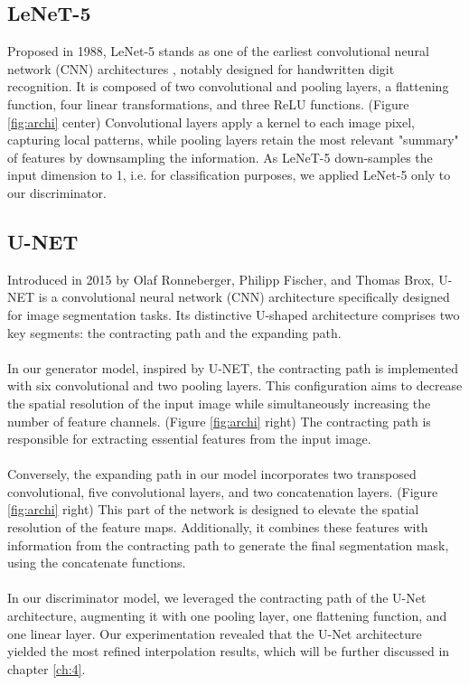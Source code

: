 \subsection{LeNeT-5}\label{sub:lenet}
Proposed in 1988, LeNet-5 stands as one of the earliest convolutional neural network (CNN) architectures \cite{lecun1998gradient}, notably designed for handwritten digit recognition. It is composed of two convolutional and pooling layers, a flattening function, four linear transformations, and three ReLU functions. (Figure \ref{fig:archi} center) 
Convolutional layers apply a kernel to each image pixel, capturing local patterns, while pooling layers retain the most relevant "summary" of features by downsampling the information. As LeNeT-5 down-samples the input dimension to 1, i.e. for classification purposes, we applied LeNet-5 only to our discriminator.

\subsection{U-NET}\label{sub:unet}
Introduced in 2015 by Olaf Ronneberger, Philipp Fischer, and Thomas Brox, U-NET is a convolutional neural network (CNN) architecture specifically designed for image segmentation tasks. Its distinctive U-shaped architecture comprises two key segments: the contracting path and the expanding path. \cite{ronneberger2015u, long2015fully}
\\\\
In our generator model, inspired by U-NET, the contracting path is implemented with six convolutional and two pooling layers. This configuration aims to decrease the spatial resolution of the input image while simultaneously increasing the number of feature channels. (Figure \ref{fig:archi} right) The contracting path is responsible for extracting essential features from the input image.
\\\\
Conversely, the expanding path in our model incorporates two transposed convolutional, five convolutional layers, and two concatenation layers.  (Figure \ref{fig:archi} right) This part of the network is designed to elevate the spatial resolution of the feature maps. Additionally, it combines these features with information from the contracting path to generate the final segmentation mask, using the concatenate functions.
\\\\
In our discriminator model, we leveraged the contracting path of the U-Net architecture, augmenting it with one pooling layer, one flattening function, and one linear layer. Our experimentation revealed that the U-Net architecture yielded the most refined interpolation results, which will be further discussed in chapter \ref{ch:4}.

